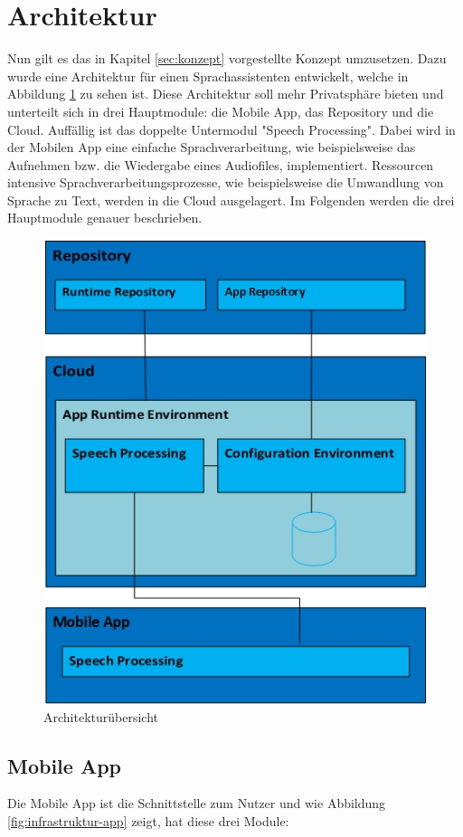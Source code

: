 \section{Architektur}
Nun gilt es das in Kapitel \ref{sec:konzept} vorgestellte Konzept umzusetzen. Dazu wurde eine Architektur für einen Sprachassistenten entwickelt, welche in Abbildung \ref{fig:infrastruktur-overview} zu sehen ist. Diese Architektur soll mehr Privatsphäre bieten und unterteilt sich in drei Hauptmodule: die Mobile App, das Repository und die Cloud. Auffällig ist das doppelte Untermodul "Speech Processing". Dabei wird in der Mobilen App eine einfache Sprachverarbeitung, wie beispielsweise das Aufnehmen bzw. die Wiedergabe eines Audiofiles, implementiert. Ressourcen intensive Sprachverarbeitungsprozesse, wie beispielsweise die Umwandlung von Sprache zu Text, werden in die Cloud ausgelagert. Im Folgenden werden die drei Hauptmodule genauer beschrieben.
\begin{figure}[h!]
	\centering
	\includegraphics[width=0.8\linewidth]{Picture/Infrastruktur-Overview.jpg}
	\caption[Architekturübersicht]{Architekturübersicht}
	\label{fig:infrastruktur-overview}
\end{figure}

\subsection{Mobile App}
Die Mobile App ist die Schnittstelle zum Nutzer und wie Abbildung \ref{fig:infrastruktur-app} zeigt, hat diese drei Module:


